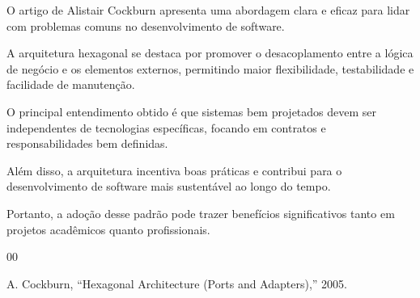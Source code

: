 \documentclass[conference]{IEEEtran}
\begin{document}
O artigo de Alistair Cockburn apresenta uma abordagem clara e eficaz para lidar com problemas comuns no desenvolvimento de software.

A arquitetura hexagonal se destaca por promover o desacoplamento entre a lógica de negócio e os elementos externos, permitindo maior flexibilidade, testabilidade e facilidade de manutenção.

O principal entendimento obtido é que sistemas bem projetados devem ser independentes de tecnologias específicas, focando em contratos e responsabilidades bem definidas.

Além disso, a arquitetura incentiva boas práticas e contribui para o desenvolvimento de software mais sustentável ao longo do tempo.

Portanto, a adoção desse padrão pode trazer benefícios significativos tanto em projetos acadêmicos quanto profissionais.

\begin{thebibliography}{00}

A. Cockburn,
``Hexagonal Architecture (Ports and Adapters),''
2005.

\end{thebibliography}
\end{document}
